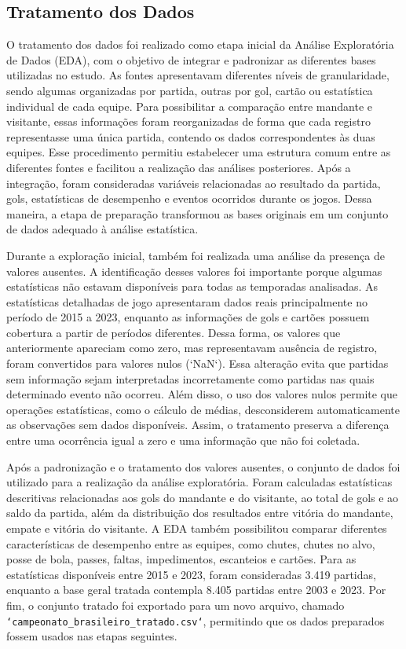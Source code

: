 \documentclass[pdflatex,sn-mathphys-num]{sn-jnl}%
\theoremstyle{thmstyleone}%
\theoremstyle{thmstyletwo}%
\theoremstyle{thmstylethree}%
\begin{document}
\subsection{Tratamento dos Dados}\label{subsec_tratamento}

O tratamento dos dados foi realizado como etapa inicial da Análise Exploratória de Dados (EDA), com o objetivo de integrar e padronizar as diferentes bases utilizadas no estudo. As fontes apresentavam diferentes níveis de granularidade, sendo algumas organizadas por partida, outras por gol, cartão ou estatística individual de cada equipe. Para possibilitar a comparação entre mandante e visitante, essas informações foram reorganizadas de forma que cada registro representasse uma única partida, contendo os dados correspondentes às duas equipes. Esse procedimento permitiu estabelecer uma estrutura comum entre as diferentes fontes e facilitou a realização das análises posteriores. Após a integração, foram consideradas variáveis relacionadas ao resultado da partida, gols, estatísticas de desempenho e eventos ocorridos durante os jogos. Dessa maneira, a etapa de preparação transformou as bases originais em um conjunto de dados adequado à análise estatística.

Durante a exploração inicial, também foi realizada uma análise da presença de valores ausentes. A identificação desses valores foi importante porque algumas estatísticas não estavam disponíveis para todas as temporadas analisadas. As estatísticas detalhadas de jogo apresentaram dados reais principalmente no período de 2015 a 2023, enquanto as informações de gols e cartões possuem cobertura a partir de períodos diferentes. Dessa forma, os valores que anteriormente apareciam como zero, mas representavam ausência de registro, foram convertidos para valores nulos (`NaN`). Essa alteração evita que partidas sem informação sejam interpretadas incorretamente como partidas nas quais determinado evento não ocorreu. Além disso, o uso dos valores nulos permite que operações estatísticas, como o cálculo de médias, desconsiderem automaticamente as observações sem dados disponíveis. Assim, o tratamento preserva a diferença entre uma ocorrência igual a zero e uma informação que não foi coletada.

Após a padronização e o tratamento dos valores ausentes, o conjunto de dados foi utilizado para a realização da análise exploratória. Foram calculadas estatísticas descritivas relacionadas aos gols do mandante e do visitante, ao total de gols e ao saldo da partida, além da distribuição dos resultados entre vitória do mandante, empate e vitória do visitante. A EDA também possibilitou comparar diferentes características de desempenho entre as equipes, como chutes, chutes no alvo, posse de bola, passes, faltas, impedimentos, escanteios e cartões. Para as estatísticas disponíveis entre 2015 e 2023, foram consideradas 3.419 partidas, enquanto a base geral tratada contempla 8.405 partidas entre 2003 e 2023. Por fim, o conjunto tratado foi exportado para um novo arquivo, chamado \texttt{`campeonato\_brasileiro\_tratado.csv`}, permitindo que os dados preparados fossem usados nas etapas seguintes.
\end{document}
